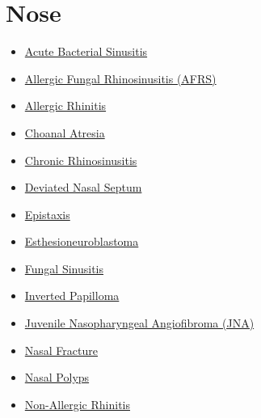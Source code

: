 \section*{Nose}
\label{sec:organ_nose}
\begin{itemize}[noitemsep]
  \item \hyperlink{sec:Acute Bacterial Sinusitis}{Acute Bacterial Sinusitis}
  \item \hyperlink{sec:Allergic Fungal Rhinosinusitis (AFRS)}{Allergic Fungal Rhinosinusitis (AFRS)}
  \item \hyperlink{sec:Allergic Rhinitis}{Allergic Rhinitis}
  \item \hyperlink{sec:Choanal Atresia}{Choanal Atresia}
  \item \hyperlink{sec:Chronic Rhinosinusitis}{Chronic Rhinosinusitis}
  \item \hyperlink{sec:Deviated Nasal Septum}{Deviated Nasal Septum}
  \item \hyperlink{sec:Epistaxis}{Epistaxis}
  \item \hyperlink{sec:Esthesioneuroblastoma}{Esthesioneuroblastoma}
  \item \hyperlink{sec:Fungal Sinusitis}{Fungal Sinusitis}
  \item \hyperlink{sec:Inverted Papilloma}{Inverted Papilloma}
  \item \hyperlink{sec:Juvenile Nasopharyngeal Angiofibroma (JNA)}{Juvenile Nasopharyngeal Angiofibroma (JNA)}
  \item \hyperlink{sec:Nasal Fracture}{Nasal Fracture}
  \item \hyperlink{sec:Nasal Polyps}{Nasal Polyps}
  \item \hyperlink{sec:Non-Allergic Rhinitis}{Non-Allergic Rhinitis}
\end{itemize}

